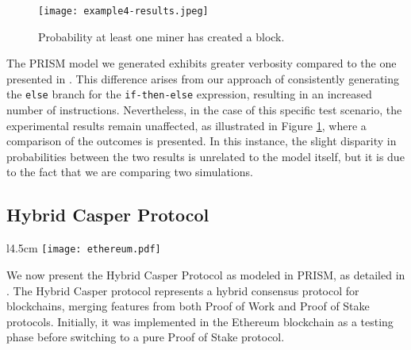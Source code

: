 \begin{figure}[h]
	\centering
	\texttt{[image: example4-results.jpeg]}	
	\caption{Probability at least one miner has created a block.}
	\label{ex3-res}
	\end{figure}
The PRISM model we generated exhibits greater verbosity compared to the one presented in \cite{DBLP:journals/concurrency/BistarelliNGLMV23}. This difference arises from our approach of consistently generating the \texttt{else} branch for the \texttt{if-then-else} expression, resulting in an increased number of instructions.
Nevertheless, in the case of this specific test scenario, the experimental results remain unaffected, as illustrated in Figure \ref{ex3-res}, where a comparison of the outcomes is presented. In this instance, the slight disparity in probabilities between the two results is unrelated to the model itself, but it is due to the fact that we are comparing two simulations.



\subsection{Hybrid Casper Protocol}
\begin{wrapfigure}[12]{l}{4.5cm}
	\texttt{[image: ethereum.pdf]}	
\end{wrapfigure} 
We now present the Hybrid Casper Protocol as modeled in PRISM, as detailed in \cite{DBLP:journals/distribledger/GallettaLMV23}. The Hybrid Casper protocol represents a hybrid consensus protocol for blockchains, merging features from both Proof of Work and Proof of Stake protocols. Initially, it was implemented in the Ethereum blockchain \cite{ethereum} as a testing phase before switching to a pure Proof of Stake protocol.

